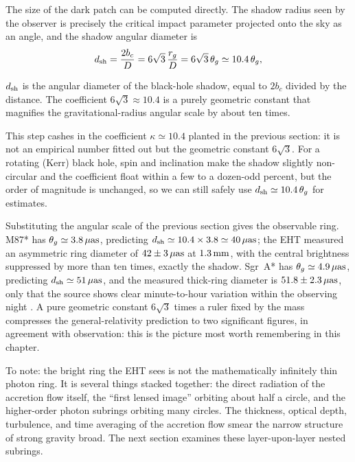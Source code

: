 The size of the dark patch can be computed directly. The shadow radius seen by the observer is precisely the critical impact parameter projected onto the sky as an angle, and the shadow angular diameter is
\begin{equation}
  d_{\rm sh}=\frac{2b_c}{D}=6\sqrt{3}\,\frac{r_g}{D}=6\sqrt{3}\,\theta_g\simeq10.4\,\theta_g,
  \label{eq:e19-shadow}
\end{equation}
\begin{formulaexplain}
\(d_{\rm sh}\) is the angular diameter of the black-hole shadow, equal to \(2b_c\) divided by the distance. The coefficient \(6\sqrt3\approx10.4\) is a purely geometric constant that magnifies the gravitational-radius angular scale by about ten times.
\end{formulaexplain}
This step cashes in the coefficient \(\kappa\simeq10.4\) planted in the previous section: it is not an empirical number fitted out but the geometric constant \(6\sqrt3\). For a rotating (Kerr) black hole, spin and inclination make the shadow slightly non-circular and the coefficient float within a few to a dozen-odd percent, but the order of magnitude is unchanged, so we can still safely use \(d_{\rm sh}\simeq10.4\,\theta_g\) for estimates.

Substituting the angular scale of the previous section gives the observable ring. M87* has \(\theta_g\simeq3.8\,\mu{\rm as}\), predicting \(d_{\rm sh}\simeq10.4\times3.8\simeq40\,\mu{\rm as}\); the EHT measured an asymmetric ring diameter of \(42\pm3\,\mu{\rm as}\) at \(1.3\,{\rm mm}\), with the central brightness suppressed by more than ten times, exactly the shadow. Sgr~A* has \(\theta_g\simeq4.9\,\mu{\rm as}\), predicting \(d_{\rm sh}\simeq51\,\mu{\rm as}\), and the measured thick-ring diameter is \(51.8\pm2.3\,\mu{\rm as}\), only that the source shows clear minute-to-hour variation within the observing night \citep{2019ApJ...875L...4E,2019ApJ...875L...5E,2022ApJ...930L..14E,2022ApJ...930L..15E}. A pure geometric constant \(6\sqrt3\) times a ruler fixed by the mass compresses the general-relativity prediction to two significant figures, in agreement with observation: this is the picture most worth remembering in this chapter.

To note: the bright ring the EHT sees is not the mathematically infinitely thin photon ring. It is several things stacked together: the direct radiation of the accretion flow itself, the ``first lensed image'' orbiting about half a circle, and the higher-order photon subrings orbiting many circles. The thickness, optical depth, turbulence, and time averaging of the accretion flow smear the narrow structure of strong gravity broad. The next section examines these layer-upon-layer nested subrings.

